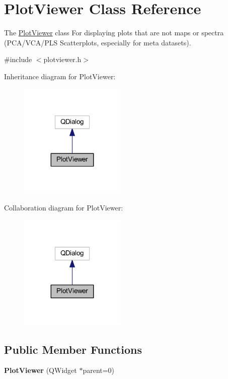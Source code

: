 \hypertarget{class_plot_viewer}{\section{Plot\+Viewer Class Reference}
\label{class_plot_viewer}
}


The \hyperlink{class_plot_viewer}{Plot\+Viewer} class For displaying plots that are not maps or spectra (P\+C\+A/\+V\+C\+A/\+P\+L\+S Scatterplots, especially for meta datasets).  




{\ttfamily \#include $<$plotviewer.\+h$>$}



Inheritance diagram for Plot\+Viewer\+:\nopagebreak
\begin{figure}[H]
\begin{center}
\leavevmode
\includegraphics[width=143pt]{class_plot_viewer__inherit__graph}
\end{center}
\end{figure}


Collaboration diagram for Plot\+Viewer\+:\nopagebreak
\begin{figure}[H]
\begin{center}
\leavevmode
\includegraphics[width=143pt]{class_plot_viewer__coll__graph}
\end{center}
\end{figure}
\subsection*{Public Member Functions}
\begin{DoxyCompactItemize}
\item 
\hypertarget{class_plot_viewer_afb9e03202aa5f8eda0a107130129af89}{{\bfseries Plot\+Viewer} (Q\+Widget $\ast$parent=0)}\label{class_plot_viewer_afb9e03202aa5f8eda0a107130129af89}

\end{DoxyCompactItemize}


